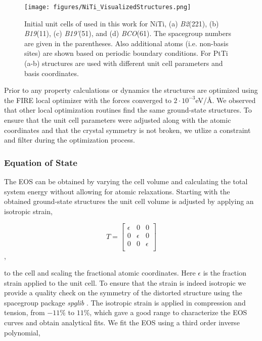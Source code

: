 \documentclass[preprint]{elsarticle}
\begin{document}
\begin{figure}[ht!]
    \begin{centering}
        \texttt{[image: figures/NiTi\_VisualizedStructures.png]}
        \caption{
          Initial unit cells of used in this work for NiTi, (a) \textit{B2}(221), (b) \textit{B19}(11), (c) \textit{B19'}(51), and (d) \textit{BCO}(61). The spacegroup numbers are given in the parentheses. Also additional atoms (i.e. non-basis sites) are shown based on periodic boundary conditions. For PtTi (a-b) structures are used with different unit cell parameters and basis coordinates. 
        }
        \label{fig:niti_structures}
    \end{centering}
\end{figure}

Prior to any property calculations or dynamics the structures are optimized using the FIRE\cite{Bitzek2006} local optimizer with the forces converged to $2\cdot 10^{-3}$eV/\AA. We observed that other local optimization routines find the same ground-state structures. To ensure that the unit cell parameters were adjusted along with the atomic coordinates and that the crystal symmetry is not broken, we utlize a constraint and filter during the optimization process. \par

\subsubsection{Equation of State}
The EOS can be obtained by varying the cell volume and calculating the total system energy without allowing for atomic relaxations. Starting with the obtained ground-state structures the unit cell volume is adjusted by applying an isotropic strain,

\begin{equation}
  \label{eq:isotropic_strain}
  T=\begin{bmatrix}
    \epsilon & 0 & 0 \\
    0 & \epsilon & 0 \\
    0 & 0 & \epsilon \\
  \end{bmatrix}
\end{equation},

to the cell and scaling the fractional atomic coordinates. Here $\epsilon$ is the fraction strain applied to the unit cell. To ensure that the strain is indeed isotropic we provide a quality check on the symmetry of the distorted structure using the spacegroup package \textit{spglib} \cite{Togo2018}. The isotropic strain is applied in compression and tension, from $-11\%$ to $11\%$, which gave a good range to characterize the EOS curves and obtain analytical fits. We fit the EOS using a third order inverse polynomial,
\end{document}
